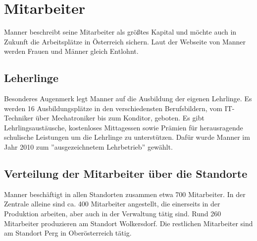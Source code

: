 \section{Mitarbeiter}
Manner beschreibt seine Mitarbeiter als größtes Kapital und möchte auch in Zukunft die Arbeitsplätze in Österreich sichern.
Laut der Webseite von Manner werden Frauen und Männer gleich Entlohnt.\cite{josef_manner}

\subsection{Leherlinge}
Besonderes Augenmerk legt Manner auf die Ausbildung der eigenen Lehrlinge. Es werden 16 Ausbildungsplätze in den verschiedensten Berufsbildern, vom IT-Techniker über Mechatroniker bis zum Konditor, geboten. Es gibt Lehrlingsaustäusche, kostenloses Mittagessen sowie Prämien für herausragende schulische Leistungen um die Lehrlinge zu unterstützen. Dafür wurde Manner im Jahr 2010 zum ''ausgezeichnetem Lehrbetrieb'' gewählt.\cite{josef_manner}

\subsection{Verteilung der Mitarbeiter über die Standorte}
Manner beschäftigt in allen Standorten zusammen etwa 700 Mitarbeiter. In der Zentrale alleine sind ca. 400 Mitarbeiter angestellt, die einerseits in der Produktion arbeiten, aber auch in der Verwaltung tätig sind. Rund 260 Mitarbeiter produzieren am Standort Wolkersdorf. Die restlichen Mitarbeiter sind am Standort Perg in Oberösterreich tätig.\cite{josef_manner}
